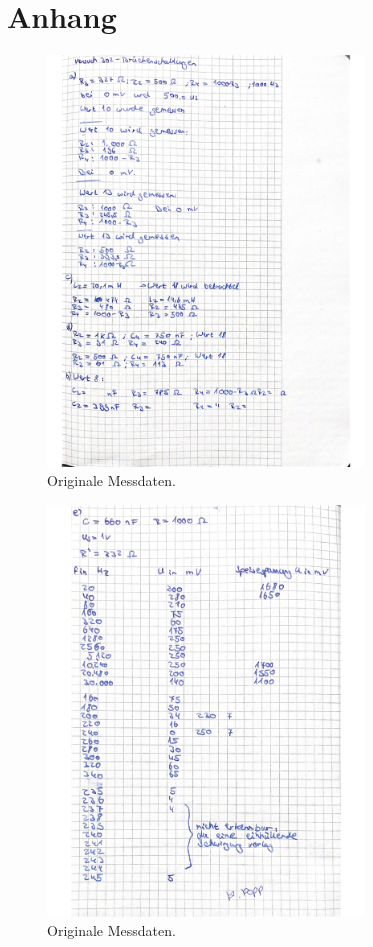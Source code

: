 \section{Anhang}
\label{sec:Anhang}

\begin{figure}[H]
    \centering
    \includegraphics[width=0.75\textwidth]{dateien/daten1.jpg}
    \caption{Originale Messdaten.}
    \label{fig:daten1}
  \end{figure}
  
  \begin{figure}[H]
    \centering
    \includegraphics[width=0.75\textwidth]{dateien/daten2.jpg}
    \caption{Originale Messdaten.}
    \label{fig:daten2}
  \end{figure}